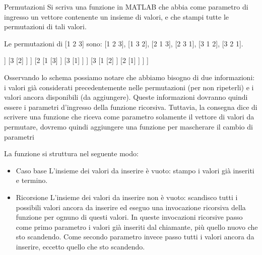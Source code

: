 \documentclass[format=169,]{beamer}
\begin{document}
\begin{frame}[allowframebreaks]{Permutazioni}
	Si scriva una funzione in MATLAB che abbia come parametro di ingresso un vettore contenente un insieme di valori, e che stampi tutte le permutazioni di
	tali valori.
	
	Le permutazioni di [1 2 3] sono:
	[1 2 3], [1 3 2], [2 1 3], [2 3 1], [3 1 2], [3 2 1].
	
	\begin{center}
	\begin{forest}
	[123
		[1
			[2
				[3]
			]
			[3
				[2]
			]
		]		
		[2
			[1
				[3]
			]
			[3
				[1]
			]
		]
		[3
			[1
				[2]
			]
			[2
				[1]
			]
		]	
	]
	\end{forest}
\end{center}

\framebreak
Osservando lo schema possiamo notare che abbiamo bisogno di due
informazioni: i valori già considerati precedentemente nelle permutazioni (per non ripeterli) e i valori ancora disponibili (da aggiungere). Queste informazioni dovranno quindi essere i parametri d'ingresso della funzione ricorsiva. Tuttavia, la consegna dice di scrivere una funzione che riceva come parametro solamente il vettore di valori da permutare, \alert{dovremo quindi aggiungere una funzione per mascherare il cambio di parametri}

\framebreak
La funzione si struttura nel seguente modo:
\begin{itemize}
	\item \alert{Caso base} L'insieme dei valori da inserire è vuoto: stampo i valori già inseriti e termino.
	\item \alert{Ricorsione} L'insieme dei valori da inserire non è vuoto: scandisco tutti i possibili valori
	ancora da inserire ed eseguo una invocazione ricorsiva della funzione per
	ognuno di questi valori. In queste invocazioni ricorsive passo come primo
	parametro i valori già inseriti dal chiamante, più quello nuovo che sto
	scandendo. Come secondo parametro invece passo tutti i valori ancora da
	inserire, eccetto quello che sto scandendo.
\end{itemize}
\end{frame}
\end{document}

